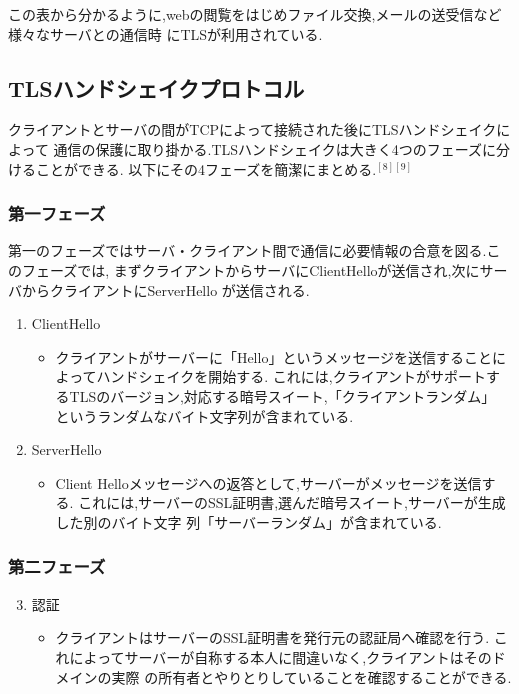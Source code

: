 \documentclass[dvipdfmx,autodetect-engine,titlepage]{jsarticle}
\begin{document}
この表から分かるように,webの閲覧をはじめファイル交換,メールの送受信など様々なサーバとの通信時
にTLSが利用されている.

\subsection{TLSハンドシェイクプロトコル}

クライアントとサーバの間がTCPによって接続された後にTLSハンドシェイクによって
通信の保護に取り掛かる.TLSハンドシェイクは大きく4つのフェーズに分けることができる.
以下にその4フェーズを簡潔にまとめる.\begin{math}^{[8][9]}\end{math}\\

\subsubsection*{第一フェーズ}
第一のフェーズではサーバ・クライアント間で通信に必要情報の合意を図る.このフェーズでは,
まずクライアントからサーバにClientHelloが送信され,次にサーバからクライアントにServerHello
が送信される.

\begin{enumerate}
  \item ClientHello
  \begin{itemize}
    \item[] クライアントがサーバーに「Hello」というメッセージを送信することによってハンドシェイクを開始する.
          これには,クライアントがサポートするTLSのバージョン,対応する暗号スイート,「クライアントランダム」
          というランダムなバイト文字列が含まれている.
  \end{itemize}
  \item ServerHello
  \begin{itemize}
    \item[] Client Helloメッセージへの返答として,サーバーがメッセージを送信する.
            これには,サーバーのSSL証明書,選んだ暗号スイート,サーバーが生成した別のバイト文字
            列「サーバーランダム」が含まれている.
  \end{itemize}
\end{enumerate}


\subsubsection*{第二フェーズ}

\begin{enumerate}
  \setcounter{enumi}{2}
  \item 認証
  \begin{itemize}
    \item[] クライアントはサーバーのSSL証明書を発行元の認証局へ確認を行う.
            これによってサーバーが自称する本人に間違いなく,クライアントはそのドメインの実際
            の所有者とやりとりしていることを確認することができる.
  \end{itemize}
\end{enumerate}
\end{document}
